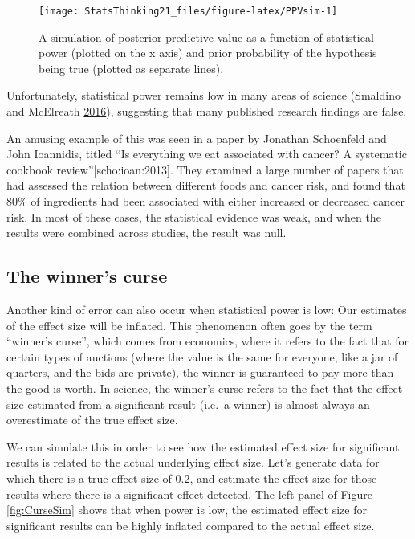 \documentclass[12pt,]{book}
\theoremstyle{definition}
\theoremstyle{definition}
\theoremstyle{definition}
\theoremstyle{remark}
\begin{document}
\begin{figure}
\texttt{[image: StatsThinking21\_files/figure-latex/PPVsim-1]} \caption{A simulation of posterior predictive value as a function of statistical power (plotted on the x axis) and prior probability of the hypothesis being true (plotted as separate lines).}\label{fig:PPVsim}
\end{figure}

Unfortunately, statistical power remains low in many areas of science (Smaldino and McElreath \protect\hyperlink{ref-smal:mcel:2016}{2016}), suggesting that many published research findings are false.

An amusing example of this was seen in a paper by Jonathan Schoenfeld and John Ioannidis, titled ``Is everything we eat associated with cancer? A systematic cookbook review''{[}scho:ioan:2013{]}. They examined a large number of papers that had assessed the relation between different foods and cancer risk, and found that 80\% of ingredients had been associated with either increased or decreased cancer risk. In most of these cases, the statistical evidence was weak, and when the results were combined across studies, the result was null.

\hypertarget{the-winners-curse}{%
\subsection{The winner's curse}\label{the-winners-curse}}

Another kind of error can also occur when statistical power is low: Our estimates of the effect size will be inflated. This phenomenon often goes by the term ``winner's curse'', which comes from economics, where it refers to the fact that for certain types of auctions (where the value is the same for everyone, like a jar of quarters, and the bids are private), the winner is guaranteed to pay more than the good is worth. In science, the winner's curse refers to the fact that the effect size estimated from a significant result (i.e.~a winner) is almost always an overestimate of the true effect size.

We can simulate this in order to see how the estimated effect size for significant results is related to the actual underlying effect size. Let's generate data for which there is a true effect size of 0.2, and estimate the effect size for those results where there is a significant effect detected. The left panel of Figure \ref{fig:CurseSim} shows that when power is low, the estimated effect size for significant results can be highly inflated compared to the actual effect size.
\end{document}
